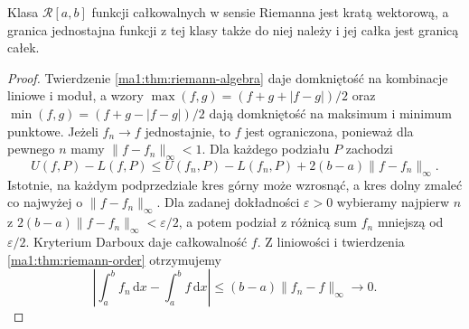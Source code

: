 \begin{wniosek}
Klasa $\mathcal R[a,b]$ funkcji całkowalnych w sensie Riemanna jest kratą wektorową, a granica jednostajna funkcji z tej klasy także do niej należy i jej całka jest granicą całek.
\end{wniosek}
\begin{proof}
Twierdzenie \ref{ma1:thm:riemann-algebra} daje domkniętość na kombinacje liniowe i moduł, a wzory $\max(f,g)=(f+g+|f-g|)/2$ oraz $\min(f,g)=(f+g-|f-g|)/2$ dają domkniętość na maksimum i minimum punktowe.
Jeżeli $f_n\to f$ jednostajnie, to $f$ jest ograniczona, ponieważ dla pewnego $n$ mamy $\|f-f_n\|_\infty<1$. Dla każdego podziału $P$ zachodzi
\[
 U(f,P)-L(f,P)\le U(f_n,P)-L(f_n,P)+2(b-a)\|f-f_n\|_\infty.
\]
Istotnie, na każdym podprzedziale kres górny może wzrosnąć, a kres dolny zmaleć co najwyżej o $\|f-f_n\|_\infty$. Dla zadanej dokładności $\varepsilon>0$ wybieramy najpierw $n$ z $2(b-a)\|f-f_n\|_\infty<\varepsilon/2$, a potem podział z różnicą sum $f_n$ mniejszą od $\varepsilon/2$. Kryterium Darboux daje całkowalność $f$. Z liniowości i twierdzenia \ref{ma1:thm:riemann-order} otrzymujemy
\[
 \left|\int_a^b f_n\,\mathrm dx-\int_a^b f\,\mathrm dx\right|
 \le (b-a)\|f_n-f\|_\infty\longrightarrow0.
\]
\end{proof}

